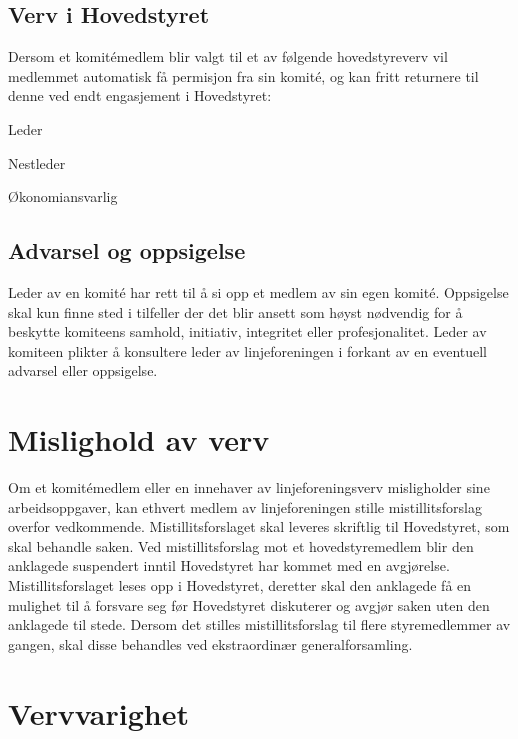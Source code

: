 \subsection{Verv i Hovedstyret}{
Dersom et komitémedlem blir valgt til et av følgende hovedstyreverv vil medlemmet automatisk få permisjon fra sin komité, og kan fritt \linebreak returnere til denne ved endt engasjement i Hovedstyret:
\begin{liste}
	\item Leder
	\item Nestleder
	\item Økonomiansvarlig
\end{liste}
}

\subsection{Advarsel og oppsigelse}{
Leder av en komité har rett til å si opp et medlem av sin egen komité. Oppsigelse skal kun finne sted i tilfeller der det blir ansett som høyst nødvendig for å beskytte komiteens samhold, initiativ, integritet eller profesjonalitet. Leder av komiteen plikter å konsultere leder av linjeforeningen i forkant av en eventuell advarsel eller oppsigelse.
}

\section{Mislighold av verv}
\vspace{23pt}

Om et komitémedlem eller en innehaver av linjeforeningsverv misligholder sine arbeidsoppgaver, kan ethvert medlem av linjeforeningen stille mistillitsforslag overfor vedkommende. Mistillitsforslaget skal leveres skriftlig til Hovedstyret, som skal behandle saken. Ved mistillitsforslag mot et hovedstyremedlem blir den anklagede suspendert inntil Hovedstyret har kommet med en avgjørelse. Mistillitsforslaget leses opp i Hovedstyret, deretter skal den anklagede få en mulighet til å forsvare seg før Hovedstyret diskuterer og avgjør saken uten den anklagede til stede. Dersom det stilles mistillitsforslag til flere styremedlemmer av gangen, skal disse behandles ved ekstraordinær generalforsamling.


\section{Vervvarighet}
\vspace{23pt}

